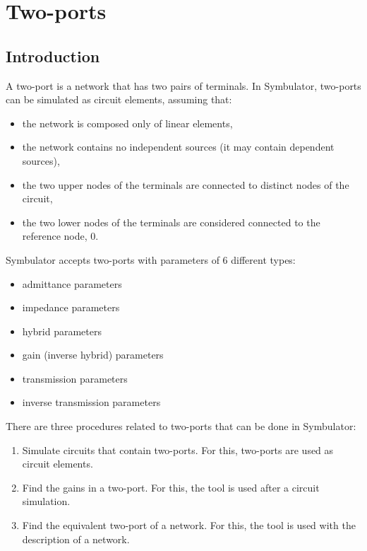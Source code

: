 
\chapter{Two-ports}

\section{Introduction}

A two-port is a network that has two pairs of terminals. In
Symbulator, two-ports can be simulated as circuit elements, assuming
that:

\begin{itemize}
\item the network is composed only of linear elements,
\item the network contains no independent sources (it may contain
  dependent sources),
\item the two upper nodes of the terminals are connected to distinct
  nodes of the circuit,
\item the two lower nodes of the terminals are considered connected
  to the reference node, 0.
\end{itemize}

Symbulator accepts two-ports with parameters of 6 different types:

\begin{itemize}
\item admittance parameters
\item impedance parameters
\item hybrid parameters
\item gain (inverse hybrid) parameters
\item transmission parameters
\item inverse transmission parameters
\end{itemize}

There are three procedures related to two-ports that can be done in
Symbulator:

\begin{enumerate}
\item Simulate circuits that contain two-ports. For this, two-ports
  are used as circuit elements.
\item Find the gains in a two-port. For this, the  tool
  is used after a circuit simulation.
\item Find the equivalent two-port of a network. For this, the
   tool is used with the description of a network.
\end{enumerate}

